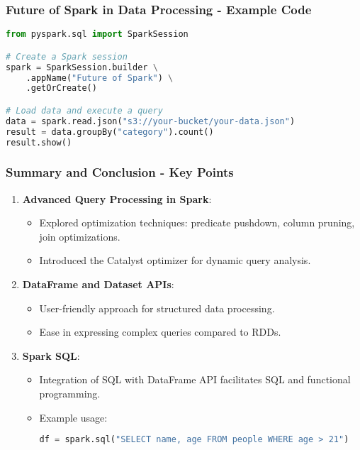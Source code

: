 \documentclass[aspectratio=169]{beamer}
\begin{document}
\begin{frame}[fragile]
    \frametitle{Future of Spark in Data Processing - Example Code}
    \begin{lstlisting}[language=Python]
from pyspark.sql import SparkSession

# Create a Spark session
spark = SparkSession.builder \
    .appName("Future of Spark") \
    .getOrCreate()

# Load data and execute a query
data = spark.read.json("s3://your-bucket/your-data.json")
result = data.groupBy("category").count()
result.show()
    \end{lstlisting}
\end{frame}

\begin{frame}[fragile]
    \frametitle{Summary and Conclusion - Key Points}
    \begin{enumerate}
        \item \textbf{Advanced Query Processing in Spark}:
            \begin{itemize}
                \item Explored optimization techniques: predicate pushdown, column pruning, join optimizations.
                \item Introduced the Catalyst optimizer for dynamic query analysis.
            \end{itemize}
        \item \textbf{DataFrame and Dataset APIs}:
            \begin{itemize}
                \item User-friendly approach for structured data processing.
                \item Ease in expressing complex queries compared to RDDs.
            \end{itemize}
        \item \textbf{Spark SQL}:
            \begin{itemize}
                \item Integration of SQL with DataFrame API facilitates SQL and functional programming.
                \item Example usage: 
                \begin{lstlisting}[language=Python]
df = spark.sql("SELECT name, age FROM people WHERE age > 21")
                \end{lstlisting}
            \end{itemize}
    \end{enumerate}
\end{frame}
\end{document}
